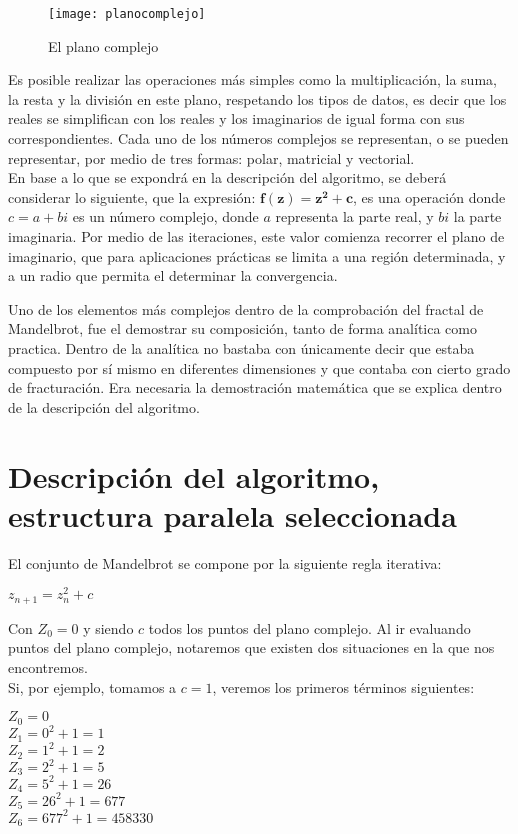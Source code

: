 \documentclass[12pt,a4paper]{article}
\begin{document}
		\begin{figure}[h]
			\centering
			\texttt{[image: planocomplejo]}
			\caption{El plano complejo}
		\end{figure}
		
		Es posible realizar las operaciones más simples como la multiplicación, la suma, la resta y la división en este plano, respetando los tipos de datos, es decir que los reales se simplifican con los reales y los imaginarios de igual forma con sus correspondientes. Cada uno de los números complejos se representan, o se pueden representar, por medio de tres formas: polar, matricial y vectorial.\\
		En base a lo que se expondrá en la descripción del algoritmo, se deberá considerar lo siguiente, que la expresión: $\mathbf{f(z) = z^2 + c}$, es una operación donde $c = a + bi$ es un número complejo, donde $a$ representa la parte real, y $bi$ la parte imaginaria. Por medio de las iteraciones, este valor comienza recorrer el plano de imaginario, que para aplicaciones prácticas se limita a una región determinada, y a un radio que permita el determinar la convergencia.
				
		Uno de los elementos más complejos dentro de la comprobación del fractal de Mandelbrot, fue el demostrar su composición, tanto de forma analítica como practica. Dentro de la analítica no bastaba con únicamente decir que estaba compuesto por sí mismo en diferentes dimensiones y que contaba con cierto grado de fracturación. Era necesaria la demostración matemática que se explica dentro de la descripción del algoritmo.  
		
	\section{Descripción del algoritmo, estructura paralela seleccionada}
		El conjunto de Mandelbrot se compone por la siguiente regla iterativa:
		\begin{center}
			$z_{n+1} = z_{n}^2 + c$
		\end{center}
		
		Con  $Z_{0} = 0$ y siendo $c$ todos los puntos del plano complejo. Al ir evaluando puntos del plano complejo, notaremos que existen dos situaciones en la que nos encontremos.\\
		Si, por ejemplo, tomamos a $c = 1$, veremos los primeros términos siguientes:
		\begin{center}
			$Z_{0} = 0$\\
			$Z_{1} = 0^2 + 1 = 1$\\
			$Z_{2} = 1^2 + 1 = 2$\\
			$Z_{3} = 2^2 + 1 = 5$\\
			$Z_{4} = 5^2 + 1 = 26$\\
			$Z_{5} = 26^2 + 1 = 677$\\
			$Z_{6}= 677^2 + 1 = 458330$\\
		\end{center}
	
\end{document}
